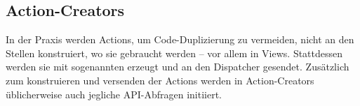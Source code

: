 \subsection{Action-Creators}
\label{ssec:gf_action_creators}

In der Praxis werden Actions, um Code-Duplizierung zu vermeiden, nicht an den
Stellen konstruiert, wo sie gebraucht werden -- vor allem in Views.  Stattdessen
werden sie mit sogenannten  erzeugt und an den
Dispatcher gesendet.  Zusätzlich zum konstruieren und versenden der Actions
werden in Action-Creators üblicherweise auch jegliche API-Abfragen initiiert.
